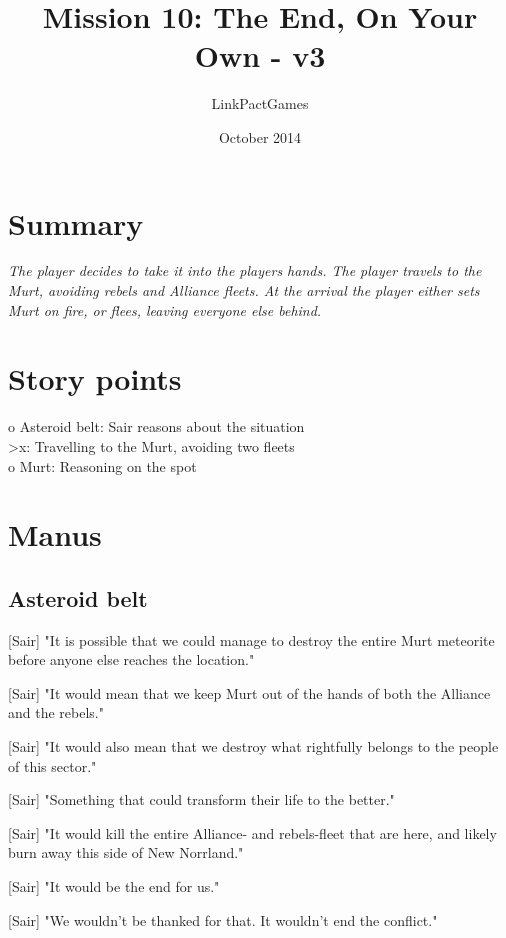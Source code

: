 \documentclass[a4paper,12pt]{article}
\begin{document}
\title{Mission 10: The End, On Your Own - v3}
\author{LinkPactGames}
\date{October 2014}
\maketitle

\section{Summary}

\textit{The player decides to take it into the players hands. The player travels to the Murt, avoiding
rebels and Alliance fleets. At the arrival the player either sets Murt on fire, or flees, leaving everyone else behind.}

\section{Story points}

o Asteroid belt: Sair reasons about the situation\\
\textgreater x: Travelling to the Murt, avoiding two fleets\\
o Murt: Reasoning on the spot

\section{Manus}

\subsection{Asteroid belt}

[Sair] "It is possible that we could manage to destroy the entire Murt meteorite before anyone else
reaches the location."

[Sair] "It would mean that we keep Murt out of the hands of both the Alliance and the rebels."

[Sair] "It would also mean that we destroy what rightfully belongs to the people of this sector."

[Sair] "Something that could transform their life to the better."

[Sair] "It would kill the entire Alliance- and rebels-fleet that are here, and likely burn away this side of New Norrland."

[Sair] "It would be the end for us."

[Sair] "We wouldn't be thanked for that. It wouldn't end the conflict." 
\end{document}
